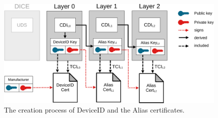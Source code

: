 \begin{figure}[htpb]
  \centering
  \includegraphics[width=1\linewidth]{figures/dice-certs.pdf}
  \caption{The creation process of DeviceID and the Alias certificates.} \label{fig:dice_certs}
\end{figure}
